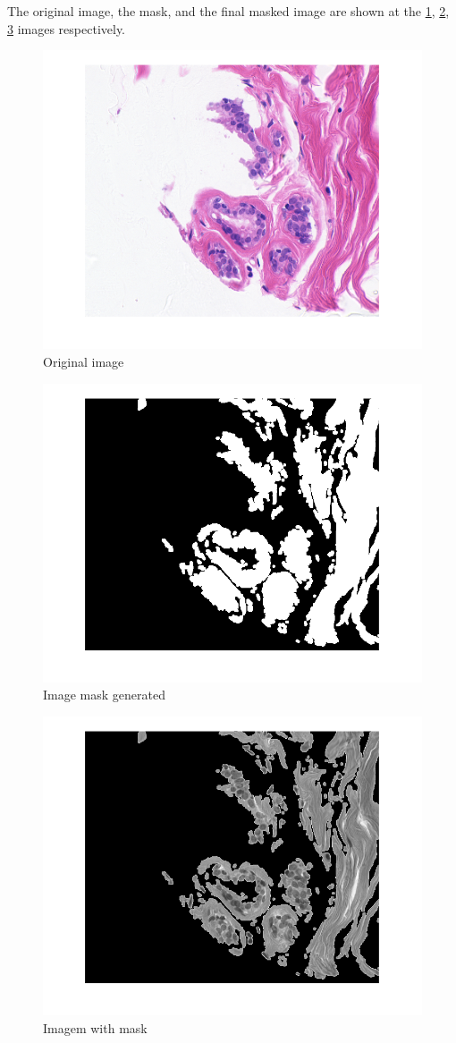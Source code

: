 \documentclass[conference]{IEEEtran}
\begin{document}
	\par The original image, the mask, and the final masked image are shown at the \ref{fig:original}, \ref{fig:mask}, \ref{fig:maskedimage} images respectively.
	\begin{figure}[h]
		\centering
		\includegraphics[width=0.7\linewidth]{images/fourrierFiltering/original}
		\caption{Original image}
		\label{fig:original}
	\end{figure}

	\begin{figure}[h]
		\centering
		\includegraphics[width=0.7\linewidth]{images/fourrierFiltering/mask}
		\caption{Image mask generated}
		\label{fig:mask}
	\end{figure}

	\begin{figure}[h]
		\centering
		\includegraphics[width=0.7\linewidth]{images/fourrierFiltering/maskedImage}
		\caption{Imagem with mask}
		\label{fig:maskedimage}
	\end{figure}
\end{document}
